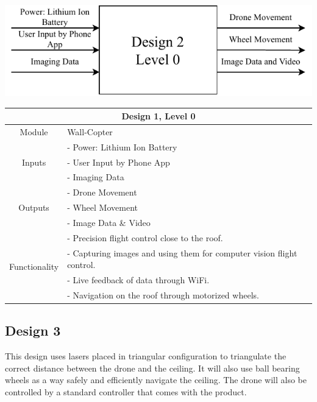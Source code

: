 \documentclass[12pt]{article}
\begin{document}
            \vspace{0.5in}
            \centerline{\includegraphics{./resources/assignment3-Design2.schematic.drawio.pdf}}

            \vspace{0.5in}
            \begin{tabular}{|c|l|}
                \hline
                \multicolumn{2}{|c|}{\textbf{Design 1, Level 0}} \\\hline
                Module & Wall-Copter \\\hline
                \multirow{3}{3cm}{Inputs}
                    & - Power: Lithium Ion Battery\\
                    & - User Input by Phone App \\
                    & - Imaging Data \\
                    \hline
                \multirow{3}{3cm}{Outputs}
                    & - Drone Movement \\
                    & - Wheel Movement \\
                    & - Image Data \& Video \\
                    \hline
                \multirow{4}{3cm}{Functionality}
                    & - Precision flight control close to the roof. \\
                    & - Capturing images and using them for computer vision flight control. \\
                    & - Live feedback of data through WiFi. \\
                    & - Navigation on the roof through motorized wheels. \\
                    \hline
                
            \end{tabular}

        \newpage
        \subsection{Design 3}
            This design uses lasers placed in triangular configuration to triangulate the correct distance between the drone and the ceiling. It will also use ball bearing wheels as a way safely and efficiently navigate the ceiling. The drone will also be controlled by a standard controller that comes with the product.
\end{document}
